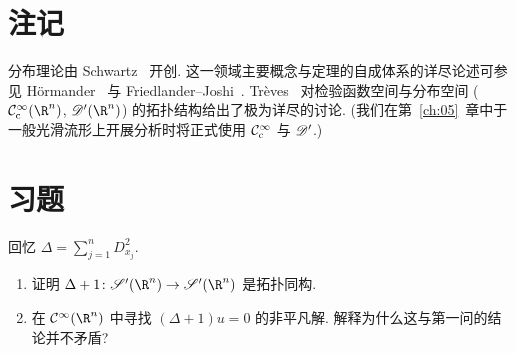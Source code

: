 \section*{注记}

分布理论由 Schwartz~\cite{Sch52} 开创. 这一领域主要概念与定理的自成体系的详尽论述可参见 Hörmander~\cite{Hor03} 与 Friedlander--Joshi~\cite{Fri98}. Trèves~\cite{Tre67} 对检验函数空间与分布空间 ($\SmoothComp(\R^n)$, $\Distr(\R^n)$) 的拓扑结构给出了极为详尽的讨论. (我们在第~\ref{ch:05}~章中于一般光滑流形上开展分析时将正式使用 $\mathcal{C}_{\mathrm{c}}^\infty$ 与 $\mathscr{D}'$.)

\section*{习题}

\begin{exer}[平移 Laplace 算子]\label{ex:2.1}
回忆 $\Delta = \sum_{j=1}^n D_{x_j}^2$.
\begin{enumerate}
    \item 证明 $\Delta + 1 \colon \TempDistr(\R^n) \to \TempDistr(\R^n)$ 是拓扑同构.
    \item 在 $\Smooth(\R^n)$ 中寻找 $(\Delta + 1) u = 0$ 的非平凡解. 解释为什么这与第一问的结论并不矛盾?
\end{enumerate}
\end{exer}

